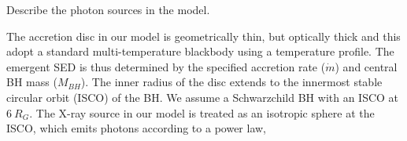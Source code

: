 \documentclass[useAMS,usenatbib]{mn2e_x}
\begin{document}
Describe the photon sources in the model.

The accretion disc in our model is geometrically thin, but optically thick
and this adopt a standard multi-temperature blackbody
using a \cite{shakurasunyaev1973} temperature profile. 
The emergent SED is thus determined by the specified accretion rate ($\dot{m}$)
and central BH mass ($M_{BH}$).
The inner radius of the disc extends to the innermost stable circular orbit
(ISCO) of the BH. 
We assume a Schwarzchild BH with an ISCO at $6~R_G$.
The X-ray source in our model is treated as an isotropic sphere at the ISCO,
which emits photons according to a power law,









\end{document}

